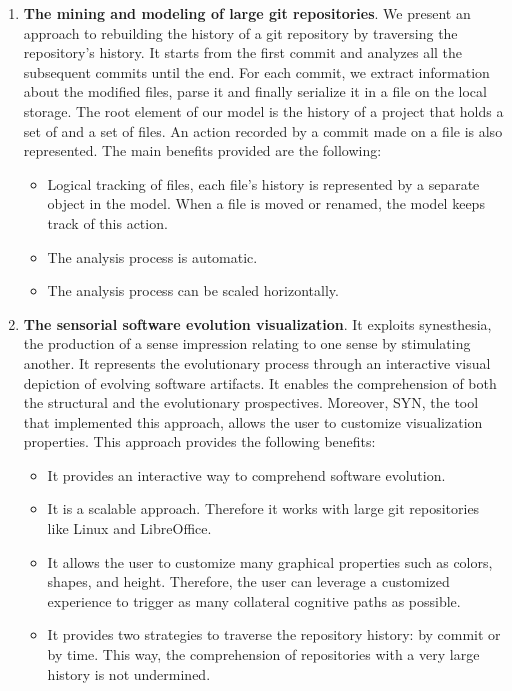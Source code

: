 \begin{enumerate}
    \item \textbf{The mining and modeling of large git repositories}. We present an approach to rebuilding the history of a git repository by traversing the repository's history. It starts from the first commit and analyzes all the subsequent commits until the end.
    For each commit, we extract information about the modified files, parse it and finally serialize it in a file on the local storage. The root element of our model is the history of a project that holds a set of and a set of files. An action recorded by a commit made on a file is also represented. The main benefits provided are the following: \begin{itemize}
        \item Logical tracking of files, each file's history is represented by a separate object in the model. When a file is moved or renamed, the model keeps track of this action. 
        \item The analysis process is automatic. 
        \item The analysis process can be scaled horizontally. 
    \end{itemize}
    \item \textbf{The sensorial software evolution visualization}. It exploits synesthesia, the production of a sense impression relating to one sense by stimulating another. It represents the evolutionary process through an interactive visual depiction of evolving software artifacts. It enables the comprehension of both the structural and the evolutionary prospectives. Moreover, SYN, the tool that implemented this approach, allows the user to customize visualization properties. This approach provides the following benefits:
    \begin{itemize}
        \item It provides an interactive way to comprehend software evolution.
        \item It is a scalable approach. Therefore it works with large git repositories like Linux and LibreOffice.
        \item It allows the user to customize many graphical properties such as colors, shapes, and height. Therefore, the user can leverage a customized experience to trigger as many collateral cognitive paths as possible. 
        \item It provides two strategies to traverse the repository history: by commit or by time. This way, the comprehension of repositories with a very large history is not undermined. 

\end{itemize}
\end{enumerate}
